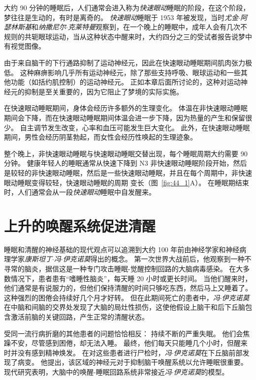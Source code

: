 大约 90 分钟的睡眠后，人们通常会进入称为\textit{快速眼动}睡眠的阶段，在这个阶段，梦往往是生动的，有时是离奇的。
\textit{快速眼动}睡眠于 1953 年被发现，当时\textit{尤金$\cdot$阿瑟林斯基}和\textit{纳撒尼尔$\cdot$克莱特曼}观察到，在一个晚上的睡眠中，成年人会有几次不规则的共轭眼球运动，当从这种状态中醒来时，大约四分之三的受试者报告说梦中有视觉图像。


由于来自脑干的下行通路抑制了运动神经元，因此在快速眼动睡眠期间肌肉张力极低。
这种麻痹影响几乎所有运动神经元，除了那些支持呼吸、眼球运动和一些其他功能（如括约肌控制）的运动神经元。
正如本章后面所讨论的，这种对运动神经元的抑制是至关重要的，因为它阻止了梦境的实际实施。


在快速眼动睡眠期间，身体会经历许多额外的生理变化。
体温在非快速眼动睡眠期间会下降，而在快速眼动睡眠期间体温会进一步下降，因为热量的产生和保留很少。
自主调节发生改变，心率和血压可能发生巨大变化。
此外，在快速眼动睡眠期间，男性会经历阴茎勃起，而女性会经历性唤起的生理迹象。


整个晚上，非快速眼动睡眠与快速眼动睡眠交替出现，每个睡眠周期大约需要 90 分钟。
健康年轻人的睡眠通常从快速下降到 N3 非快速眼动睡眠阶段开始，然后是较轻的非快速眼动睡眠，然后是一些快速眼动睡眠，并且在每个周期中，非快速眼动睡眠变得较轻，快速眼动睡眠的周期 变长（图~\ref{fig:44_1}A）。
在睡眠期结束时，人们通常会从一段\textit{快速眼动}睡眠中自发醒来。



\section{上升的唤醒系统促进清醒}

睡眠和清醒的神经基础的现代观点可以追溯到大约 100 年前由神经学家和神经病理学家\textit{康斯坦丁$\cdot$冯$\cdot$伊克诺莫}得出的概念。
第一次世界大战前后，他观察到一种不寻常的脑炎，据信这是一种专门攻击睡眠-觉醒控制回路的大脑病毒感染。
在大多数情况下，患者患有“嗜睡性脑炎”，每天睡 20 小时或更长时间。
当他们醒来时，他们通常是有说服力的，但他们保持清醒的时间只够吃东西，然后马上又睡着了。
这种强烈的困倦会持续好几个月才好转。
但在此期间死亡的患者中，\textit{冯$\cdot$伊克诺莫}在中脑和间脑的交界处发现了大脑的局灶性损伤，这使他假设上脑干和后下丘脑包含激活前脑的关键回路，产生正常的清醒状态。


受同一流行病折磨的其他患者的问题恰恰相反：
持续不断的严重失眠。
他们会焦躁不安，尽管感到困倦，却无法入睡。
最终，他们每天只能睡几个小时，但醒来时并没有感到精神焕发。
在对这些患者进行尸检时，\textit{冯$\cdot$伊克诺莫}在下丘脑前部发现了病变。
他提出，该区域的神经元对于抑制脑干唤醒系统以允许睡眠很重要。
现代研究表明，大脑中的唤醒-睡眠回路系统非常接近\textit{冯$\cdot$伊克诺莫}的模型。



